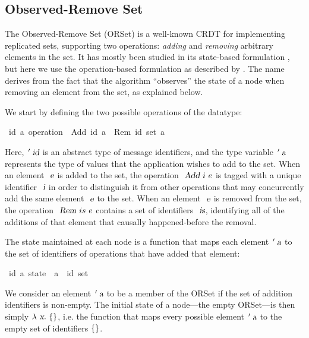 \subsection{Observed-Remove Set}
\label{subsect.orset}

The Observed-Remove Set (ORSet) is a well-known CRDT for implementing replicated sets, supporting two operations: \emph{adding} and \emph{removing} arbitrary elements in the set.
It has mostly been studied in its state-based formulation \cite{Bieniusa:2012wu,Bieniusa:2012gt,Brown:2014hs,Zeller:2014fl}, but here we use the operation-based formulation as described by \citet{Shapiro:2011wy}.
The name derives from the fact that the algorithm ``observes'' the state of a node when removing an element from the set, as explained below.

We start by defining the two possible operations of the datatype:
\begin{isabelle}
\ {\isacharparenleft}{\isacharprime}id{\isacharcomma}\ {\isacharprime}a{\isacharparenright}\ operation\ {\isacharequal}\ Add\ {\isachardoublequoteopen}{\isacharprime}id{\isachardoublequoteclose}\ {\isachardoublequoteopen}{\isacharprime}a{\isachardoublequoteclose}\ {\isacharbar}\ Rem\ {\isachardoublequoteopen}{\isacharparenleft}{\isacharprime}id\ set{\isacharparenright}{\isachardoublequoteclose}\ {\isachardoublequoteopen}{\isacharprime}a{\isachardoublequoteclose}
\end{isabelle}
\noindent Here, $\isacharprime\isa{id}$ is an abstract type of message identifiers, and the type variable $\isacharprime\isa{a}$ represents the type of values that the application wishes to add to the set.
When an element $\isa{e}$ is added to the set, the operation $\isa{Add}\ i\ e$ is tagged with a unique identifier $\isa{i}$ in order to distinguish it from other operations that may concurrently add the same element $\isa{e}$ to the set.
When an element $\isa{e}$ is removed from the set, the operation $\isa{Rem}\ is\ e$ contains a set of identifiers $\isa{is}$, identifying all of the additions of that element that causally happened-before the removal.

The state maintained at each node is a function that maps each element $\isacharprime\isa{a}$ to the set of identifiers of operations that have added that element:
\begin{isabelle}
\ {\isacharparenleft}{\isacharprime}id{\isacharcomma}\ {\isacharprime}a{\isacharparenright}\ state\ {\isacharequal}\ {\isachardoublequoteopen}{\isacharprime}a\ {\isasymRightarrow}\ {\isacharprime}id\ set{\isachardoublequoteclose}
\end{isabelle}
We consider an element $\isacharprime\isa{a}$ to be a member of the ORSet if the set of addition identifiers is non-empty.
The initial state of a node---the empty ORSet---is then simply $\isasymlambda\isa{x}\isachardot\ \isacharbraceleft\isacharbraceright$, i.e. the function that maps every possible element $\isacharprime\isa{a}$ to the empty set of identifiers $\emph{$\{$}\emph{$\}$}$.

